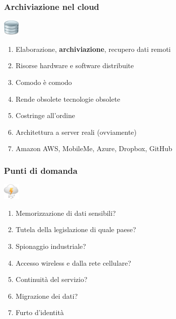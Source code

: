 \documentclass[xcolor=svgnames]{beamer}
\begin{document}
\begin{frame}
	\frametitle{Archiviazione nel cloud}

	\begin{block}{\includegraphics[width=30px]{img/storage.png}}
			\begin{enumerate}
					\item Elaborazione, {\bf archiviazione}, recupero dati remoti
						\pause
					\item Risorse hardware e software distribuite
						\pause
					\item Comodo è comodo
						\pause
					\item Rende obsolete tecnologie obsolete
						\pause
					\item Costringe all'ordine
						\pause
					\item Architettura a server reali (ovviamente)
						\pause
					\item Amazon AWS, MobileMe, Azure, Dropbox, GitHub
			\end{enumerate}
	\end{block}
\end{frame}

\begin{frame}
	\frametitle{Punti di domanda}

	\begin{block}{\includegraphics[width=30px]{img/cloud.png}}
			\begin{enumerate}
					\item Memorizzazione di dati sensibili?
						\pause
					\item Tutela della legislazione di quale paese?
						\pause
					\item Spionaggio industriale?
						\pause
					\item Accesso wireless e dalla rete cellulare?
						\pause
					\item Continuità del servizio?
						\pause
					\item Migrazione dei dati?
						\pause
					\item Furto d'identità
			\end{enumerate}
	\end{block}
\end{frame}
\end{document}
